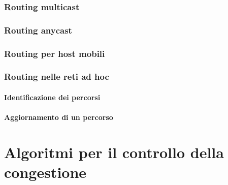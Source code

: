 \documentclass{article}
\begin{document}
\subsubsection{Routing multicast}
\subsubsection{Routing anycast}
\subsubsection{Routing per host mobili}
\subsubsection{Routing nelle reti ad hoc}
\paragraph{Identificazione dei percorsi}
\paragraph{Aggiornamento di un percorso}
\section{Algoritmi per il controllo della congestione}
\end{document}
